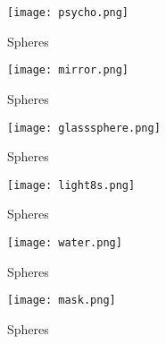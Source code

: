 \begin{figure}[htb!]
\centering
  \caption{Spheres}
  \texttt{[image: psycho.png]}
\end{figure}


\begin{figure}[htb!]
\centering
  \caption{Spheres}
  \texttt{[image: mirror.png]}
\end{figure}


\begin{figure}[htb!]
\centering
  \caption{Spheres}
  \texttt{[image: glasssphere.png]}
\end{figure}

\begin{figure}[htb!]
\centering
  \caption{Spheres}
  \texttt{[image: light8s.png]}
\end{figure}


\begin{figure}[htb!]
\centering
  \caption{Spheres}
  \texttt{[image: water.png]}
\end{figure}

\begin{figure}[htb!]
\centering
  \caption{Spheres}
  \texttt{[image: mask.png]}
\end{figure}

